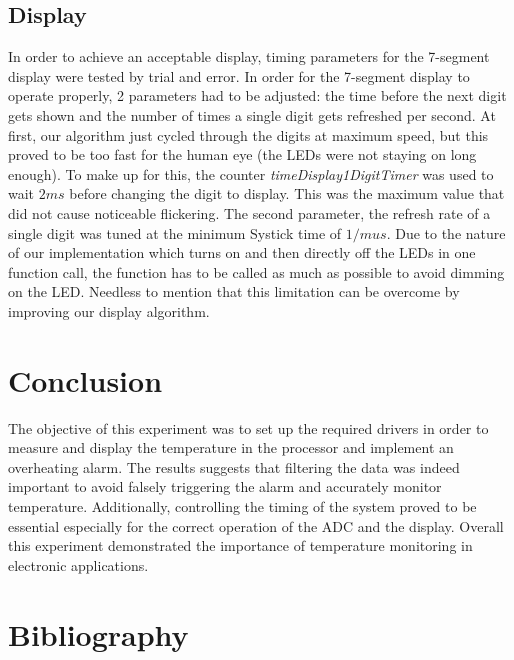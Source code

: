 \documentclass[12pt]{article}
\begin{document}
\subsection{Display}
In order to achieve an acceptable display, timing parameters for the 7-segment display were tested by trial and error. In order for the 7-segment display to operate properly, 2 parameters had to be adjusted: the time before the next digit gets shown and the number of times a single digit gets refreshed per second. At first, our algorithm just cycled through the digits at maximum speed, but this proved to be too fast for the human eye (the LEDs were not staying on long enough). To make up for this, the counter \textit{timeDisplay1DigitTimer} was used to wait $2ms$ before changing the digit to display. This was the maximum value that did not cause noticeable flickering. The second parameter, the refresh rate of a single digit was tuned at the minimum Systick time of $1/mu s$. Due to the nature of our implementation which turns on and then directly off the LEDs in one function call, the function has to be called as much as possible to avoid dimming on the LED. Needless to mention that this limitation can be overcome by improving our display algorithm.

\section{Conclusion}
The objective of this experiment was to set up the required drivers in order to measure and display the temperature in the processor and implement an overheating alarm. The results suggests that filtering the data was indeed important to avoid falsely triggering the alarm and accurately monitor temperature. Additionally, controlling the timing of the system proved to be essential especially for the correct operation of the ADC and the display. Overall this experiment demonstrated the importance of temperature monitoring in electronic applications.

\newpage
\section{Bibliography}

 
\end{document}
